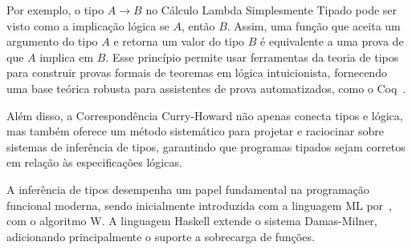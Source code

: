 Por exemplo, o tipo $A \to B$ no Cálculo Lambda Simplesmente Tipado pode ser visto como a implicação lógica se $A$, então $B$.
Assim, uma função que aceita um argumento do tipo $A$ e retorna um valor do tipo $B$ é equivalente a uma prova de que $A$ implica em $B$.
Esse princípio permite usar ferramentas da teoria de tipos para construir provas formais de teoremas em lógica intuicionista, fornecendo uma base teórica robusta para assistentes de prova automatizados, como o Coq~\cite{COQUAND1998}.

Além disso, a Correspondência Curry-Howard não apenas conecta tipos e lógica, mas também oferece um método sistemático para projetar e raciocinar sobre sistemas de inferência de tipos, garantindo que programas tipados sejam corretos em relação às especificações lógicas.

A inferência de tipos desempenha um papel fundamental na programação funcional moderna, sendo inicialmente introduzida com a linguagem ML por~, com o algoritmo W.
A linguagem Haskell extende o sistema Damas-Milner, adicionando principalmente o suporte a sobrecarga de funções.
